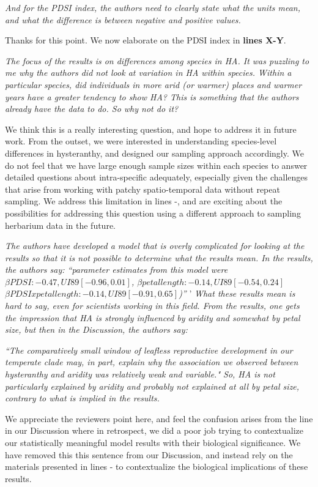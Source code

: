 \documentclass{article}[12pt]
\begin{document}
\emph{And for the PDSI index, the authors need to clearly state what the units mean, and what the difference is between negative and positive values.} 

Thanks for this point. We now elaborate on the PDSI index in \textbf{lines X-Y}.

\emph{The focus of the results is on differences among species in HA.  It was puzzling to me why the authors did not look at variation in HA within species. Within a particular species, did individuals in more arid (or warmer) places and warmer years have a greater tendency to show HA? This is something that the authors already have the data to do. So why not do it?}

We think this is a really interesting question, and hope to address it in future work. From the outset, we were interested in understanding species-level differences in hysteranthy, and designed our sampling approach accordingly.
We do not feel that we have large enough sample sizes within each species to answer detailed questions about intra-specific adequately, especially given the challenges that arise from working with patchy spatio-temporal data without repeat sampling. We address this limitation in lines -, and are exciting about the possibilities for addressing this question using a different approach to sampling herbarium data in the future.

\emph{The authors have developed a model that is overly complicated for looking at the results so that it is not possible to determine what the results mean. In the results, the authors say: 
``parameter estimates from this model were $\beta PDSI : −0.47,UI89[−0.96,0.01]$, $\beta petal length : −0.14,UI89[−0.54,0.24]$ $\beta PDSIxpetal length : −0.14,UI89[−0.91,0.65]$)''}
'
\emph{What these results mean is hard to say, even for scientists working in this field.  From the results, one gets the impression that HA is strongly influenced by aridity and somewhat by petal size, but then in the Discussion, the authors say:}

\emph{``The comparatively small window of leafless reproductive development in our temperate clade may, in part, explain why the association we observed between hysteranthy and aridity was relatively weak and variable." So, HA is not particularly explained by aridity and probably not explained at all by petal size, contrary to what is implied in the results.}

We appreciate the reviewers point here, and feel the confusion arises from the line in our Discussion where in retrospect, we did a poor job trying to contextualize our statistically meaningful model results with their biological significance. We have removed this this sentence from our Discussion, and instead rely on the materials presented in lines - to contextualize the biological implications of these results. 
\end{document}

